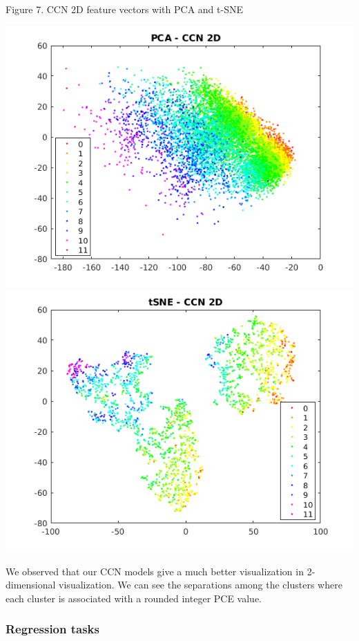 \documentclass[a4paper]{article}
\begin{document}
\begin{center}
Figure 7. CCN 2D feature vectors with PCA and t-SNE
\end{center}
\begin{center}
\includegraphics[scale=0.25]{PCA_CCN_2D}
\includegraphics[scale=0.25]{tSNE_CCN_2D}
\end{center}
We observed that our CCN models give a much better visualization in 2-dimensional visualization. We can see the separations among the clusters where each cluster is associated with a rounded integer PCE value.

\subsubsection{Regression tasks}
\end{document}
